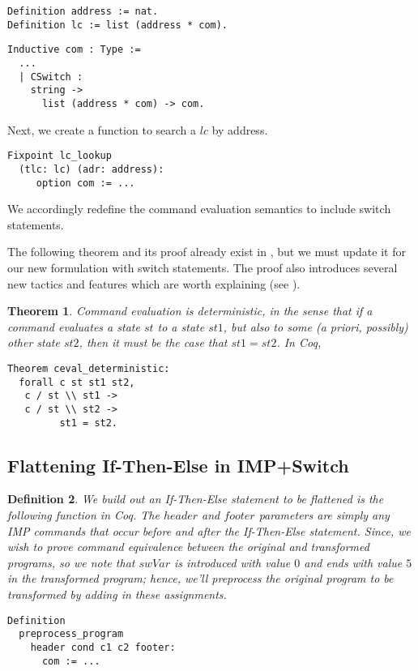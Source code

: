 \documentclass[compsoc,conference,a4paper,10pt,times]{IEEEtran}
\newtheorem{theorem}{Theorem}[section]
\newtheorem{defin}[theorem]{Definition}
\begin{document}
\begin{verbatim}
Definition address := nat.
Definition lc := list (address * com).
\end{verbatim}

\begin{verbatim}
Inductive com : Type :=
  ...
  | CSwitch : 
    string -> 
      list (address * com) -> com.
\end{verbatim}

Next, we create a function to search a $lc$ by address.
\begin{verbatim}
Fixpoint lc_lookup 
  (tlc: lc) (adr: address): 
     option com := ... 
\end{verbatim}

We accordingly redefine the command evaluation semantics to include switch statements.

The following theorem and its proof already exist in \cite{SFV2}, but we must update it for our new formulation with switch statements.  The proof also introduces several new tactics and features which are worth explaining (see \cite{Weyun}).

\begin{theorem}\label{deterministic}
Command evaluation is deterministic, in the sense that if a command evaluates a state $st$ to a state $st1$, but also to some (a priori, possibly) other state $st2$, then it must be the case that $st1 = st2$.  In Coq,
\begin{verbatim}
Theorem ceval_deterministic: 
  forall c st st1 st2,
   c / st \\ st1 -> 
   c / st \\ st2 -> 
         st1 = st2.
\end{verbatim}
\end{theorem}

\subsection{Flattening If-Then-Else in IMP+Switch}\label{flattenif}\label{4.3}

\begin{defin}
We build out an If-Then-Else statement to be flattened is the following function in Coq. The $header$ and $footer$ parameters are simply any IMP commands that occur before and after the If-Then-Else statement. Since, we wish to prove command equivalence between the original and transformed programs, so we note that $swVar$ is introduced with value $0$ and ends with value $5$ in the transformed program; hence, we'll preprocess the original program to be transformed by adding in these assignments.
 
\begin{verbatim}
Definition 
  preprocess_program 
    header cond c1 c2 footer: 
      com := ... 
 \end{verbatim}
\end{defin}
\end{document}
